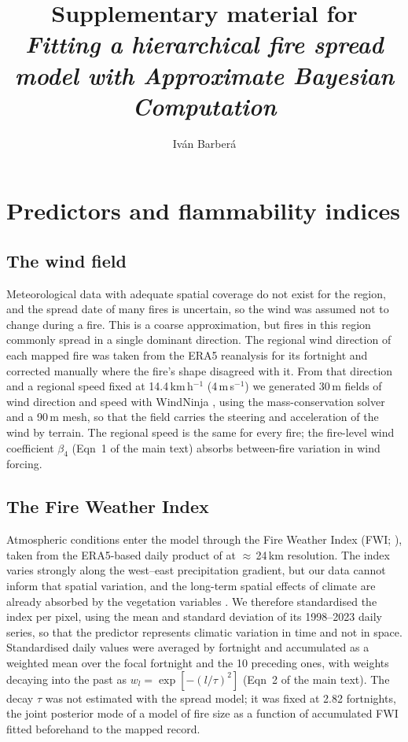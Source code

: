 \documentclass[11pt,a4paper]{article}
\title{Supplementary material for\\
\textit{Fitting a hierarchical fire spread model with Approximate Bayesian
Computation}}
\author{Iv\'an Barber\'a}
\date{}
\begin{document}
\maketitle

\section{Predictors and flammability indices}
\label{sec:fi}

\subsection{The wind field}

Meteorological data with adequate spatial coverage do not exist for the region, and
the spread date of many fires is uncertain, so the wind was assumed not to change
during a fire. This is a coarse approximation, but fires in this region commonly
spread in a single dominant direction. The regional wind direction of each mapped
fire was taken from the ERA5 reanalysis \citep{hersbach2020era5} for its fortnight
and corrected manually where the fire's shape disagreed with it. From that direction
and a regional speed fixed at 14.4\,km\,h$^{-1}$ (4\,m\,s$^{-1}$) we generated 30\,m
fields of wind direction and speed with WindNinja \citep{forthofer2007windNinja},
using the mass-conservation solver and a 90\,m mesh, so that the field carries the
steering and acceleration of the wind by terrain. The regional speed is the same for
every fire; the fire-level wind coefficient $\beta_4$ (Eqn~1 of the main text)
absorbs between-fire variation in wind forcing.

\subsection{The Fire Weather Index}

Atmospheric conditions enter the model through the Fire Weather Index (FWI;
\citealt{van_wagner_development_1987}), taken from the ERA5-based daily product of
\citet{vitolo_era5-based_2020} at $\approx$\,24\,km resolution. The index varies
strongly along the west--east precipitation gradient, but our data cannot inform
that spatial variation, and the long-term spatial effects of climate are already
absorbed by the vegetation variables \citep{barbera_patterns}. We therefore
standardised the index per pixel, using the mean and standard deviation of its
1998--2023 daily series, so that the predictor represents climatic variation in time
and not in space. Standardised daily values were averaged by fortnight and
accumulated as a weighted mean over the focal fortnight and the 10 preceding ones,
with weights decaying into the past as $w_l = \exp[-(l/\tau)^2]$ (Eqn~2 of the main
text). The decay $\tau$ was not estimated with the spread model; it was fixed at
2.82 fortnights, the joint posterior mode of a model of fire size as a function of
accumulated FWI fitted beforehand to the mapped record.
\end{document}
